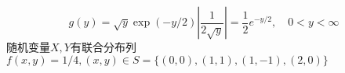 \documentclass[11pt,addpoints,landscape]{exam}
\begin{document}
\begin{multicols}{2}
\begin{questions}
	 	$$
	 	g(y)=\sqrt{y}\exp(-y / 2)\left|\dfrac{1}{2 \sqrt{y}}\right|=\dfrac{1}{2} e^{-y / 2}, \quad 0<y<\infty
	 	$$
	 	\question
	 	随机变量$X, Y$有联合分布列$f(x, y) = 1 / 4, (x, y) \in S = \{(0, 0), (1, 1), (1, -1), (2, 0)\}$
	\end{questions}
	\end{multicols}
\end{document}
